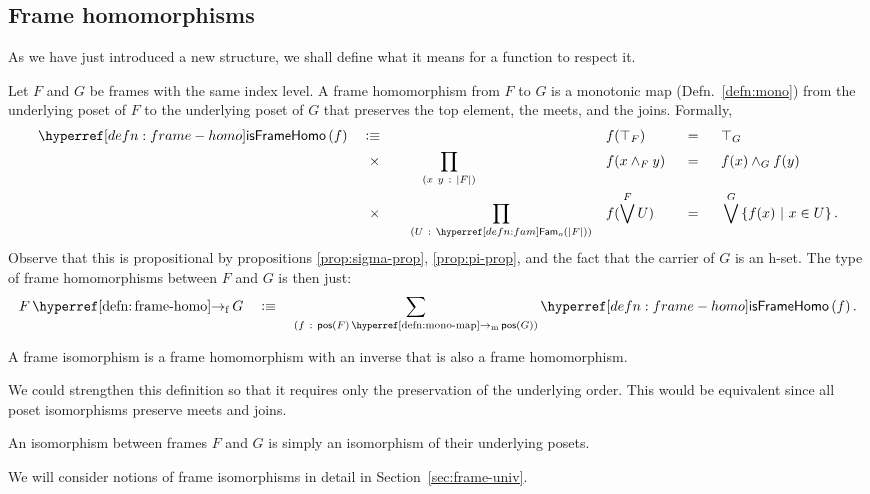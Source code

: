 \subsection{Frame homomorphisms}

As we have just introduced a new structure, we shall define what it means for a function
to respect it.

\begin{defn}\label{defn:frame-homo}
  Let $F$ and $G$ be frames with the same index level. A frame homomorphism from $F$ to
  $G$ is a monotonic map (Defn.~\ref{defn:mono}) from the underlying poset of $F$ to the
  underlying poset of $G$ that preserves the top element, the meets, and the joins.
  Formally,
  \begin{alignat*}{5}
    \isframehomo{f} \quad&\is\quad && &&f(\top_F) &&\idnm{} &&\top_G \\
      &\hspace{0.55em}\times\quad  &&\hspace{0.86em}\pity{x~y}{\abs{F}}{&&f(x \wedge_F y) &&\idnm{} &&f(x) \wedge_G f(y)} \\
      &\hspace{0.55em}\times\quad  &&\pity{U}{\sub{o}{\abs{F}}}{&&f(\bigvee^F U) &&\idnm{} &&\bigvee^G \setof{ f(x) ~|~ x \in U }}.
  \end{alignat*}
  Observe that this is propositional by propositions \ref{prop:sigma-prop},
  \ref{prop:pi-prop}, and the fact that the carrier of $G$ is an h-set. The type of frame
  homomorphisms between $F$ and $G$ is then just:
  \begin{equation*}
    \framehomo{F}{G} \quad\is\quad \sigmaty{f}{\mono{\posof{F}}{\posof{G}}}{\isframehomo{f}}.
  \end{equation*}
\end{defn}

\begin{defn}\label{defn:frame-iso}
  A frame isomorphism is a frame homomorphism with an inverse that is also a frame
  homomorphism.
\end{defn}

We could strengthen this definition so that it requires only the preservation of the
underlying order. This would be equivalent since all poset isomorphisms preserve meets and
joins.
\begin{defn}\label{defn:frame-iso-official}
  An isomorphism between frames $F$ and $G$ is simply an isomorphism of their underlying
  posets.
\end{defn}
We will consider notions of frame isomorphisms in detail in Section~\ref{sec:frame-univ}.

